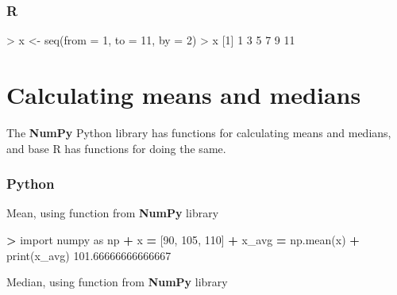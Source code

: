 \documentclass[
]{book}
\newenvironment{Shaded}{\begin{snugshade}}{\end{snugshade}}
\newcommand{\AttributeTok}[1]{\textcolor[rgb]{0.77,0.63,0.00}{#1}}
\newcommand{\BuiltInTok}[1]{#1}
\newcommand{\DecValTok}[1]{\textcolor[rgb]{0.00,0.00,0.81}{#1}}
\newcommand{\FloatTok}[1]{\textcolor[rgb]{0.00,0.00,0.81}{#1}}
\newcommand{\FunctionTok}[1]{\textcolor[rgb]{0.00,0.00,0.00}{#1}}
\newcommand{\ImportTok}[1]{#1}
\newcommand{\NormalTok}[1]{#1}
\newcommand{\OperatorTok}[1]{\textcolor[rgb]{0.81,0.36,0.00}{\textbf{#1}}}
\newcommand{\OtherTok}[1]{\textcolor[rgb]{0.56,0.35,0.01}{#1}}
\newcommand{\SpecialCharTok}[1]{\textcolor[rgb]{0.00,0.00,0.00}{#1}}
\begin{document}
\hypertarget{r-5}{%
\subsubsection*{R}\label{r-5}}

\begin{Shaded}
\begin{Highlighting}[]
\SpecialCharTok{\textgreater{}}\NormalTok{ x }\OtherTok{\textless{}{-}} \FunctionTok{seq}\NormalTok{(}\AttributeTok{from =} \DecValTok{1}\NormalTok{, }\AttributeTok{to =} \DecValTok{11}\NormalTok{, }\AttributeTok{by =} \DecValTok{2}\NormalTok{)}
\SpecialCharTok{\textgreater{}}\NormalTok{ x}
\NormalTok{[}\DecValTok{1}\NormalTok{]  }\DecValTok{1}  \DecValTok{3}  \DecValTok{5}  \DecValTok{7}  \DecValTok{9} \DecValTok{11}
\end{Highlighting}
\end{Shaded}

\hypertarget{calculating-means-and-medians}{%
\section{Calculating means and medians}\label{calculating-means-and-medians}}

The \textbf{NumPy} Python library has functions for calculating means and medians, and base R has functions for doing the same.

\hypertarget{python-6}{%
\subsubsection*{Python}\label{python-6}}

Mean, using function from \textbf{NumPy} library

\begin{Shaded}
\begin{Highlighting}[]
\OperatorTok{\textgreater{}} \ImportTok{import}\NormalTok{ numpy }\ImportTok{as}\NormalTok{ np}
\OperatorTok{+}\NormalTok{ x }\OperatorTok{=}\NormalTok{ [}\DecValTok{90}\NormalTok{, }\DecValTok{105}\NormalTok{, }\DecValTok{110}\NormalTok{]}
\OperatorTok{+}\NormalTok{ x\_avg }\OperatorTok{=}\NormalTok{ np.mean(x)}
\OperatorTok{+} \BuiltInTok{print}\NormalTok{(x\_avg)}
\FloatTok{101.66666666666667}
\end{Highlighting}
\end{Shaded}

Median, using function from \textbf{NumPy} library
\end{document}
